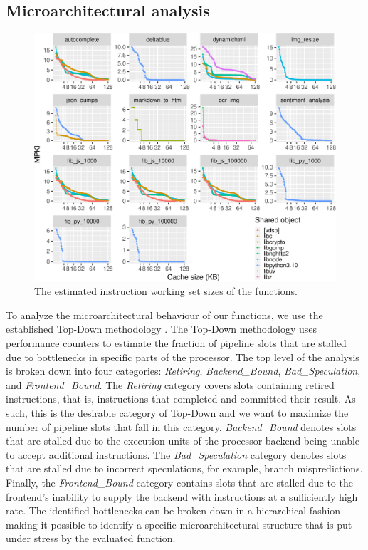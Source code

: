 \subsection{Microarchitectural analysis}
\label{wosc:subsec:topdown}

\begin{figure}
  \centering
  \includegraphics[width=\textwidth]{figures/simulated_miss_rates.pdf}
  \caption{\label{wosc:fig:code-footprint} The estimated instruction working set sizes of the functions.}
\end{figure}



To analyze the microarchitectural behaviour of our functions, we use the established Top-Down methodology \cite{yasin14_top_down}. The Top-Down methodology uses performance counters to estimate the fraction of pipeline slots that are stalled due to bottlenecks in specific parts of the processor. The top level of the analysis is broken down into four categories: \emph{Retiring}, \emph{Backend\_Bound}, \emph{Bad\_Speculation}, and \emph{Frontend\_Bound}. The \emph{Retiring} category covers slots containing retired instructions, that is, instructions that completed and committed their result. As such, this is the desirable category of Top-Down and we want to maximize the number of pipeline slots that fall in this category. \emph{Backend\_Bound} denotes slots that are stalled due to the execution units of the processor backend being unable to accept additional instructions. The \emph{Bad\_Speculation} category denotes slots that are stalled due to incorrect speculations, for example, branch mispredictions. Finally, the \emph{Frontend\_Bound} category contains slots that are stalled due to the frontend's inability to supply the backend with instructions at a sufficiently high rate. The identified bottlenecks can be broken down in a hierarchical fashion making it possible to identify a specific microarchitectural structure that is put under stress by the evaluated function.

